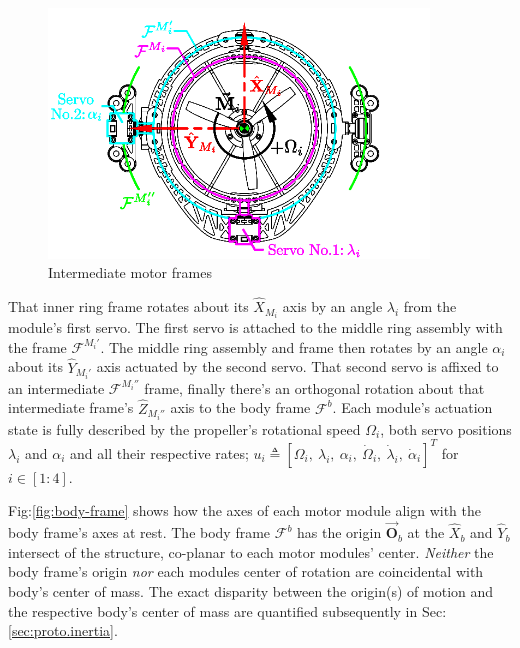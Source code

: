 \begin{figure}[hbtp]
\vspace{-10pt}
\centering
\includegraphics[width=0.9\textwidth]{figs/motor-frame}
\caption{Intermediate motor frames}
\label{fig:motor-frame}
\vspace{-8pt}
\end{figure}
\par
That inner ring frame rotates about its $\hat{X}_{M_i}$ axis by an angle $\lambda_i$ from the module's first servo. The first servo is attached to the middle ring assembly with the frame $\mathcal{F}^{M_i'}$. The middle ring assembly and frame then rotates by an angle $\alpha_i$ about its $\hat{Y}_{M_i'}$ axis actuated by the second servo. That second servo is affixed to an intermediate $\mathcal{F}^{M_i''}$ frame, finally there's an orthogonal rotation about that intermediate frame's $\hat{Z}_{M_i''}$ axis to the body frame $\mathcal{F}^b$. Each module's actuation state is fully described by the propeller's rotational speed $\Omega_i$, both servo positions $\lambda_i$ and $\alpha_i$ and all their respective rates; $u_i\triangleq[\Omega_{i},~\lambda_{i},~\alpha_{i},~\dot{\Omega}_i,~\dot{\lambda}_i,~\dot{\alpha}_i]^{T}$ for $i\in [1:4]$. 
\par
Fig:\ref{fig:body-frame} shows how the axes of each motor module align with the body frame's axes at rest. The body frame $\mathcal{F}^b$ has the origin $\vec{\mathbf{O}}_b$ at the $\hat{X}_b$ and $\hat{Y}_b$ intersect of the structure, co-planar to each motor modules' center. \emph{Neither} the body frame's origin \emph{nor} each modules center of rotation are coincidental with body's center of mass. The exact disparity between the origin(s) of motion and the respective body's center of mass are quantified subsequently in Sec:\ref{sec:proto.inertia}. 
